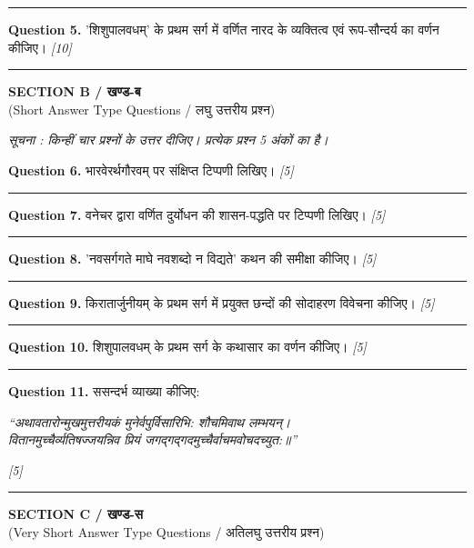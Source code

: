 \documentclass[11pt,a4paper]{article}
\newcommand{\pts}[1]{\hfill \textit{[#1]}}
\begin{document}
\medskip\rule{\linewidth}{0.2pt}\medskip

\noindent \textbf{Question 5.} 'शिशुपालवधम्' के प्रथम सर्ग में वर्णित नारद के व्यक्तित्व एवं रूप-सौन्दर्य का वर्णन कीजिए। \pts{10}

\bigskip
\rule{\linewidth}{0.2pt}
\bigskip

\begin{center}
  {\large\bfseries SECTION B / खण्ड-ब}\\[2pt]
  {\normalsize (Short Answer Type Questions / लघु उत्तरीय प्रश्न)}
\end{center}

\noindent \textit{सूचना : किन्हीं चार प्रश्नों के उत्तर दीजिए। प्रत्येक प्रश्न 5 अंकों का है।}\\[2pt]

\bigskip

\noindent \textbf{Question 6.} भारवेरर्थगौरवम् पर संक्षिप्त टिप्पणी लिखिए। \pts{5}

\medskip\rule{\linewidth}{0.2pt}\medskip

\noindent \textbf{Question 7.} वनेचर द्वारा वर्णित दुर्योधन की शासन-पद्धति पर टिप्पणी लिखिए। \pts{5}

\medskip\rule{\linewidth}{0.2pt}\medskip

\noindent \textbf{Question 8.} 'नवसर्गगते माघे नवशब्दो न विद्यते' कथन की समीक्षा कीजिए। \pts{5}

\medskip\rule{\linewidth}{0.2pt}\medskip

\noindent \textbf{Question 9.} किरातार्जुनीयम् के प्रथम सर्ग में प्रयुक्त छन्दों की सोदाहरण विवेचना कीजिए। \pts{5}

\medskip\rule{\linewidth}{0.2pt}\medskip

\noindent \textbf{Question 10.} शिशुपालवधम् के प्रथम सर्ग के कथासार का वर्णन कीजिए। \pts{5}

\medskip\rule{\linewidth}{0.2pt}\medskip

\noindent \textbf{Question 11.} ससन्दर्भ व्याख्या कीजिए:\\[2pt]
\begin{center}
\textit{``अथावतारोन्मुखमुत्तरीयकं मुनेर्वपुर्विसारिभि: शौचमिवाथ लम्भयन्‌।}\\
\textit{वितानमुच्चैर्व्यतिषज्जयन्निव प्रियं जगद्गद्गदमुच्चैर्वाचमवोचदच्युत:॥''}
\end{center} \pts{5}

\bigskip
\rule{\linewidth}{0.2pt}
\bigskip

\begin{center}
  {\large\bfseries SECTION C / खण्ड-स}\\[2pt]
  {\normalsize (Very Short Answer Type Questions / अतिलघु उत्तरीय प्रश्न)}
\end{center}
\end{document}
